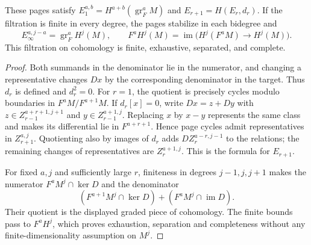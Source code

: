 \begin{lemma}
\label{lem:km-filtered-convergence}
These pages satisfy $E_1^{a,b}=H^{a+b}(\operatorname{gr}_F^aM)$ and
$E_{r+1}=H(E_r,d_r)$.  If the filtration is finite in every degree, the
pages stabilize in each bidegree and
\[
E_\infty^{a,j-a}=\operatorname{gr}_F^aH^j(M),\qquad
F^aH^j(M)=\operatorname{im}\bigl(H^j(F^aM)\to H^j(M)\bigr).
\]
This filtration on cohomology is finite, exhaustive, separated, and complete.
\end{lemma}
\begin{proof}
Both summands in the denominator lie in the numerator, and changing a
representative changes $Dx$ by the corresponding denominator in the target.
Thus $d_r$ is defined and $d_r^2=0$.  For $r=1$, the quotient is precisely
cycles modulo boundaries in $F^aM/F^{a+1}M$.
If $d_r[x]=0$, write
$Dx=z+Dy$ with $z\in Z_{r-1}^{a+r+1,j+1}$ and
$y\in Z_{r-1}^{a+1,j}$.  Replacing $x$ by $x-y$ represents the same class
and makes its differential lie in $F^{a+r+1}$.  Hence page cycles admit
representatives in $Z_{r+1}^{a,j}$.
Quotienting also by images of $d_r$ adds $D Z_r^{a-r,j-1}$ to the relations;
the remaining changes of representatives are $Z_r^{a+1,j}$.
This is the formula for $E_{r+1}$.

For fixed $a,j$ and sufficiently large $r$, finiteness in degrees $j-1,j,j+1$
makes the numerator $F^aM^j\cap\ker D$ and the denominator
\[
(F^{a+1}M^j\cap\ker D)+(F^aM^j\cap\operatorname{im}D).
\]
Their quotient is the displayed graded piece of cohomology.  The finite
bounds pass to $F^aH^j$, which proves exhaustion, separation and completeness
without any finite-dimensionality assumption on $M^j$.
\end{proof}

